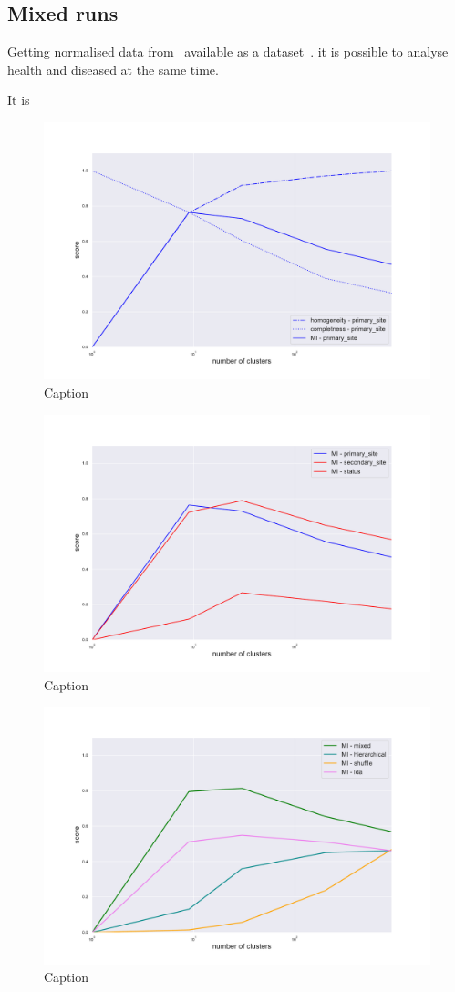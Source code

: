\subsection{Mixed runs}
Getting normalised data from~\cite{Betel2018} available as a dataset~\cite{Wang2017}. it is possible to analyse health and diseased at the same time.

It is 
\begin{figure}[htb!]
    \centering
    \includegraphics[width=0.8\linewidth]{pictures/topic/merged/metric_scores_primarysite.pdf}
    \caption{Caption}
    \label{fig:topic/merged/metric_scores_primarysite}
\end{figure}

\begin{figure}[htb!]
    \centering
    \includegraphics[width=0.8\linewidth]{pictures/topic/merged/metric_scores.pdf}
    \caption{Caption}
    \label{fig:topic/merged/metric_scores}
\end{figure}

\begin{figure}[htb!]
    \centering
    \includegraphics[width=0.8\linewidth]{pictures/topic/merged/metric_scores_all.pdf}
    \caption{Caption}
    \label{fig:topic/merged/metric_scores_all}
\end{figure}